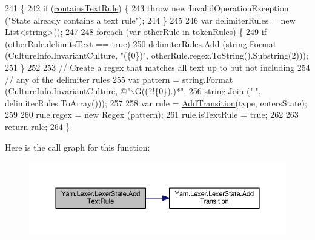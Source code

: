 \begin{DoxyCode}
241             \{
242                 \textcolor{keywordflow}{if} (\hyperlink{a00128_a69948f05c35eeae9cb8448c849a053e6}{containsTextRule}) \{
243                     \textcolor{keywordflow}{throw} \textcolor{keyword}{new} InvalidOperationException (\textcolor{stringliteral}{"State already contains a text rule"});
244                 \}
245 
246                 var delimiterRules = \textcolor{keyword}{new} List<string>();
247 
248                 \textcolor{keywordflow}{foreach} (var otherRule \textcolor{keywordflow}{in} \hyperlink{a00128_adf6563b1dc6f3ef80ed13c2b15b7be03}{tokenRules}) \{
249                     \textcolor{keywordflow}{if} (otherRule.delimitsText == \textcolor{keyword}{true})
250                         delimiterRules.Add (string.Format (CultureInfo.InvariantCulture, \textcolor{stringliteral}{"(\{0\})"}, 
      otherRule.regex.ToString().Substring(2)));
251                 \}
252 
253                 \textcolor{comment}{// Create a regex that matches all text up to but not including}
254                 \textcolor{comment}{// any of the delimiter rules}
255                 var pattern = string.Format (CultureInfo.InvariantCulture, \textcolor{stringliteral}{@"\(\backslash\)G((?!\{0\}).)*"},
256                     string.Join (\textcolor{stringliteral}{"|"}, delimiterRules.ToArray()));
257 
258                 var rule = \hyperlink{a00128_a71ba52744e853ff142de19e97cf5daed}{AddTransition}(type, entersState);
259 
260                 rule.regex = \textcolor{keyword}{new} Regex (pattern);
261                 rule.isTextRule = \textcolor{keyword}{true};
262 
263                 \textcolor{keywordflow}{return} rule;
264             \}
\end{DoxyCode}


Here is the call graph for this function\-:
\nopagebreak
\begin{figure}[H]
\begin{center}
\leavevmode
\includegraphics[width=350pt]{a00128_af183111863c651ae5681665a2c379830_cgraph}
\end{center}
\end{figure}



